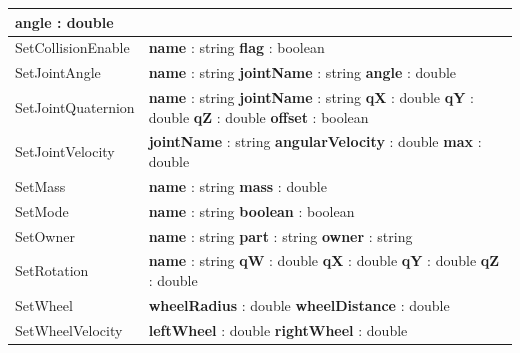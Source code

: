 \documentclass[notitlepage]{report}
\begin{document}
\begin{supertabular}{|p{4cm}|p{5cm}|}
  		\textbf{angle} : double\\
  	\hline
  	SetCollisionEnable & 
  		\textbf{name} : string\newline 
  		\textbf{flag} : boolean\\
  	\hline
  	SetJointAngle & 
  		\textbf{name} : string\newline 
  		\textbf{jointName} : string\newline
  		\textbf{angle} : double\\
  	\hline
  	SetJointQuaternion & 
  		\textbf{name} : string\newline 
  		\textbf{jointName} : string\newline
  		\textbf{qX} : double\newline
  		\textbf{qY} : double\newline
  		\textbf{qZ} : double\newline
  		\textbf{offset} : boolean\\
  	\hline
  	SetJointVelocity & 
  		\textbf{jointName} : string\newline 
  		\textbf{angularVelocity} : double\newline
  		\textbf{max} : double\\
  	\hline
  	SetMass & 
  		\textbf{name} : string\newline 
  		\textbf{mass} : double\\
  	\hline
  	SetMode & 
  		\textbf{name} : string\newline 
  		\textbf{boolean} : boolean\\
  	\hline
  	SetOwner & 
  		\textbf{name} : string\newline 
  		\textbf{part} : string\newline
  		\textbf{owner} : string\\
  	\hline
  	SetRotation & 
  		\textbf{name} : string\newline
  		\textbf{qW} : double\newline 
  		\textbf{qX} : double\newline
  		\textbf{qY} : double\newline
  		\textbf{qZ} : double\\
  	\hline
  	SetWheel & 
  		\textbf{wheelRadius} : double\newline 
  		\textbf{wheelDistance} : double\\
  	\hline
  	SetWheelVelocity & 
  		\textbf{leftWheel} : double\newline 
  		\textbf{rightWheel} : double\\
  	\hline
\end{supertabular}
\end{document}
